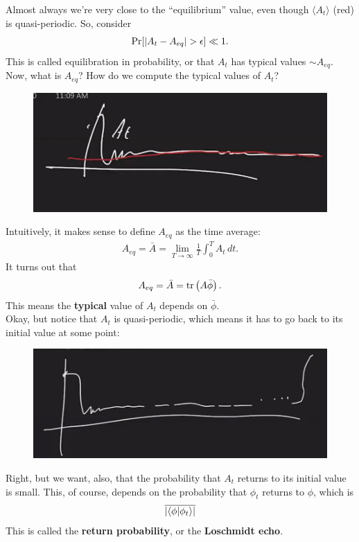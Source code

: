 \documentclass{book}
\theoremstyle{definition}
\newcommand{\f}[2]{\frac{#1}{#2}}
\newcommand{\lp}{\left(}
\newcommand{\rp}{\right)}
\begin{document}
Almost always we're very close to the ``equilibrium'' value, even though $\langle A_t\rangle$ (red) is quasi-periodic. So, consider 
\begin{align}
\Pr[\abs{A_t - A_{eq}} > \epsilon] \ll 1.
\end{align} 
This is called equilibration in probability, or that $A_t$ has typical values $\sim A_{eq}$. Now, what is $A_{eq}$? How do we compute the typical values of $A_t$? 
\begin{figure}[!htb]
	\centering
	\includegraphics[scale=0.3]{typical}
\end{figure}

Intuitively, it makes sense to define $A_{eq}$ as the time average: 
\begin{align}
A_{eq} = \bar{A} = \lim_{T\to \infty}\f{1}{T}\int^T_0 A_t \,dt.
\end{align}
It turns out that
\begin{align}
A_{eq} = \bar{A} = \tr\lp A \bar{\phi} \rp.
\end{align}
This means the \textbf{typical} value of $A_t$ depends on $\bar{\phi}$.\\

Okay, but notice that $A_t$ is quasi-periodic, which means it has to go back to its initial value at some point:
\begin{figure}[!htb]
	\centering
	\includegraphics[scale=0.3]{quasi2}
\end{figure}
Right, but we want, also, that the probability that $A_t$ returns to its initial value is small. This, of course, depends on the probability that $\phi_t$ returns to $\phi$, which is 
\begin{align}
\overline{\abs{\braket{\phi}{\phi_t}}}
\end{align} 
This is called the \textbf{return probability}, or the \textbf{Loschmidt echo}. 
\end{document}
